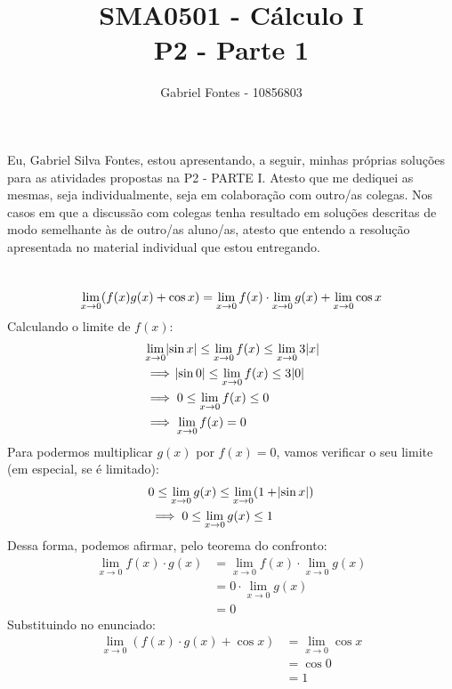 \documentclass[12pt]{article}
\title{SMA0501 - Cálculo I \\ P2 - Parte 1}%
\author{Gabriel Fontes - 10856803}%
\begin{document}
\maketitle
Eu, Gabriel Silva Fontes, estou apresentando, a seguir, minhas próprias soluções para as atividades propostas na P2 - PARTE I. %
Atesto que me dediquei as mesmas, seja individualmente, seja em colaboração com outro/as colegas.
Nos casos em que a discussão com colegas tenha resultado em soluções descritas de modo semelhante às de outro/as aluno/as, atesto que entendo a resolução apresentada no material individual que estou entregando.

\section{}
\[
    \lim_{x\rightarrow 0}(f(x)g(x)+\cos x)
    = \lim_{x\rightarrow 0}f(x) \cdot \lim_{x\rightarrow 0}g(x) + \lim_{x\rightarrow 0}\cos x \\
\]
Calculando o limite de \(f(x)\):
\begin{align*}
    & \lim_{x\rightarrow 0}\abs{\sin{x}} \leq \lim_{x\rightarrow 0}f(x) \leq \lim_{x\rightarrow 0}3\abs{x} \\
    &\implies \abs{\sin{0}} \leq \lim_{x\rightarrow 0}f(x) \leq 3\abs{0} \\
    &\implies 0 \leq \lim_{x\rightarrow 0}f(x) \leq 0 \\
    &\implies \lim_{x\rightarrow 0}f(x) = 0
\end{align*}
Para podermos multiplicar \(g(x)\) por \(f(x) = 0\), vamos verificar o seu limite (em especial, se é limitado):
\begin{align*}
    & 0 \leq \lim_{x\rightarrow 0} g(x) \leq \lim_{x\rightarrow 0} (1 + \abs{\sin x}) \\
    &\implies 0 \leq \lim_{x\rightarrow 0} g(x) \leq 1
\end{align*}
Dessa forma, podemos afirmar, pelo teorema do confronto:
\begin{align*}
    \lim_{x\rightarrow 0} f(x)\cdot g(x)
    &= \lim_{x\rightarrow 0} f(x) \cdot \lim_{x\rightarrow 0} g(x) \\
    &= 0 \cdot \lim_{x\rightarrow 0} g(x) \\
    &= 0
\end{align*}
Substituindo no enunciado:
\begin{align*}
    \lim_{x\rightarrow 0} (f(x)\cdot g(x) + \cos{x})
    &= \lim_{x\rightarrow 0} \cos{x} \\
    &= \cos{0} \\
    &= 1
\end{align*}
\end{document}
